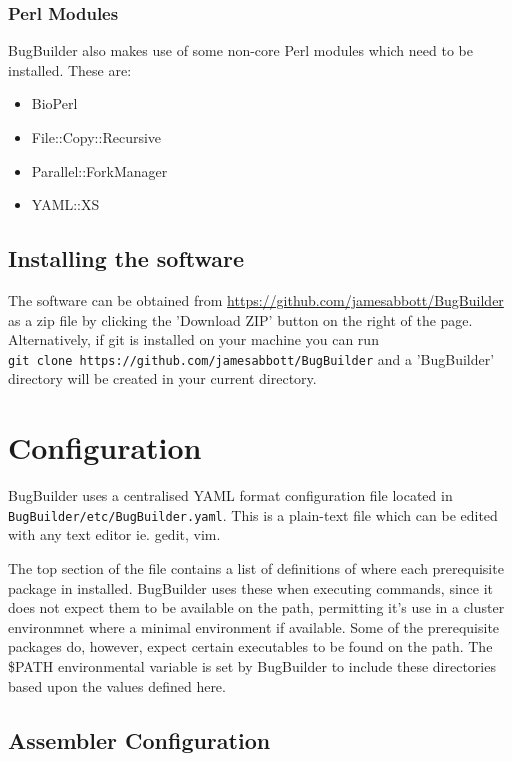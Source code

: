 \documentclass[a4paper,twoside,10pt]{article}
\begin{document}
\subsubsection{Perl Modules}

BugBuilder also makes use of some non-core Perl modules which need to be installed. These are:

\begin{itemize}
\item BioPerl 
\item File::Copy::Recursive
\item Parallel::ForkManager
\item YAML::XS
\end{itemize}

\subsection{Installing the software}

The software can be obtained from \url{https://github.com/jamesabbott/BugBuilder} as a zip file by
clicking the 'Download ZIP' button on the right of the page. Alternatively, if git is installed on
your machine you can run \\ {\tt git clone https://github.com/jamesabbott/BugBuilder} and a
'BugBuilder' directory will be created in your current directory.

\section{Configuration}

BugBuilder uses a centralised YAML format configuration file located in 
\\ {\tt BugBuilder/etc/BugBuilder.yaml}. This is a plain-text file which can be edited with any text editor
ie. gedit, vim. 

The top section of the file contains a list of definitions of where each prerequisite package in
installed. BugBuilder uses these when executing commands, since it does not expect them to be
available on the path, permitting it's use in a cluster environmnet where a minimal environment if
available. Some of the prerequisite packages do, however, expect certain executables to be found on
the path. The \$PATH environmental variable is set by BugBuilder to include these directories based
upon the values defined here.

\subsection{Assembler Configuration}
\end{document}
